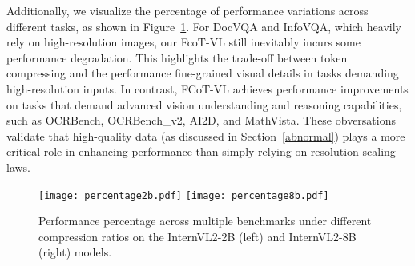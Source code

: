 
Additionally, we visualize the percentage of performance variations across different tasks, as shown in Figure~\ref{fig:percentagefcotvl}. For DocVQA and InfoVQA, which heavily rely on high-resolution images, our FcoT-VL still inevitably incurs some performance degradation. 
This highlights the trade-off between token compressing and the performance fine-grained visual details in tasks demanding high-resolution inputs. In contrast,
FCoT-VL achieves performance improvements on tasks that demand advanced vision understanding and reasoning capabilities, such as OCRBench, OCRBench\_v2, AI2D, and MathVista. These obversations validate that high-quality data (as discussed in Section~\ref{abnormal}) plays a more critical role in enhancing performance than simply relying on resolution scaling laws.
\begin{figure}[t]
\texttt{[image: percentage2b.pdf]}
\texttt{[image: percentage8b.pdf]}
  \caption {Performance percentage across multiple benchmarks under different compression ratios on the InternVL2-2B (left) and InternVL2-8B (right) models.}
  \label{fig:percentagefcotvl}
\end{figure}
